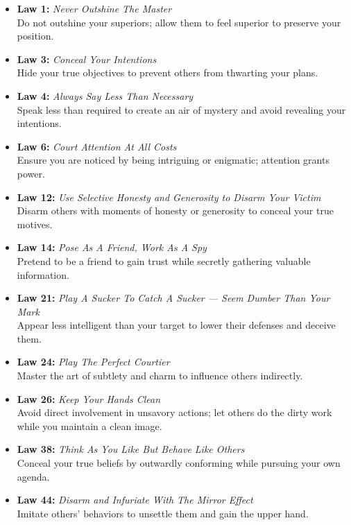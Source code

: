 \documentclass[a4paper,10.8pt]{article}
\begin{document}
\begin{itemize}[leftmargin=*, label={--}]
    \item \textbf{Law 1:} \textit{Never Outshine The Master} \\
    Do not outshine your superiors; allow them to feel superior to preserve your position.
    
    \item \textbf{Law 3:} \textit{Conceal Your Intentions} \\
    Hide your true objectives to prevent others from thwarting your plans.
    
    \item \textbf{Law 4:} \textit{Always Say Less Than Necessary} \\
    Speak less than required to create an air of mystery and avoid revealing your intentions.
    
    \item \textbf{Law 6:} \textit{Court Attention At All Costs} \\
    Ensure you are noticed by being intriguing or enigmatic; attention grants power.
    
    \item \textbf{Law 12:} \textit{Use Selective Honesty and Generosity to Disarm Your Victim} \\
    Disarm others with moments of honesty or generosity to conceal your true motives.
    
    \item \textbf{Law 14:} \textit{Pose As A Friend, Work As A Spy} \\
    Pretend to be a friend to gain trust while secretly gathering valuable information.
    
    \item \textbf{Law 21:} \textit{Play A Sucker To Catch A Sucker — Seem Dumber Than Your Mark} \\
    Appear less intelligent than your target to lower their defenses and deceive them.
    
    \item \textbf{Law 24:} \textit{Play The Perfect Courtier} \\
    Master the art of subtlety and charm to influence others indirectly.
    
    \item \textbf{Law 26:} \textit{Keep Your Hands Clean} \\
    Avoid direct involvement in unsavory actions; let others do the dirty work while you maintain a clean image.
    
    \item \textbf{Law 38:} \textit{Think As You Like But Behave Like Others} \\
    Conceal your true beliefs by outwardly conforming while pursuing your own agenda.
    
    \item \textbf{Law 44:} \textit{Disarm and Infuriate With The Mirror Effect} \\
    Imitate others' behaviors to unsettle them and gain the upper hand.
\end{itemize}
\end{document}
